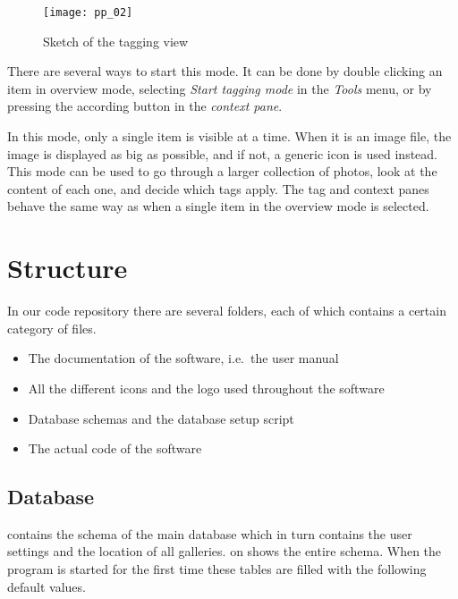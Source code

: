 \begin{figure}[!h]
	\centering
	\texttt{[image: pp\_02]}
	\caption{Sketch of the tagging view}
\end{figure}

There are several ways to start this mode. It can be done by double clicking
an item in overview mode, selecting \emph{Start tagging mode} in the
\emph{Tools} menu, or by pressing the according button in the \emph{context pane}.

In this mode, only a single item is visible at a time.
When it is an image file, the image is displayed as big as
possible, and if not, a generic icon is used instead. This mode can be used to
go through a larger collection of photos, look at the content of each one, and
decide which tags apply. The tag and context panes behave the same way as
when a single item in the overview mode is selected.


\section{Structure}
\def\kapitelautor{Clemens Stadlbauer}

In our code repository there are several folders, each of which contains a
certain category of files.

\begin{itemize}
	\item[\tfpath{doc/}] The documentation of the software, i.e.~the user manual
	\item[\tfpath{icons/}] All the different icons and the logo used throughout the software
	\item[\tfpath{db/}] Database schemas and the database setup script
	\item[\tfpath{src/}] The actual code of the software
\end{itemize}

\subsection{Database}


 contains the schema of the main database which in turn
contains the user settings and the location of all galleries.
 on  shows the entire schema. When
the program is started for the first time these tables are filled with the
following default values.

